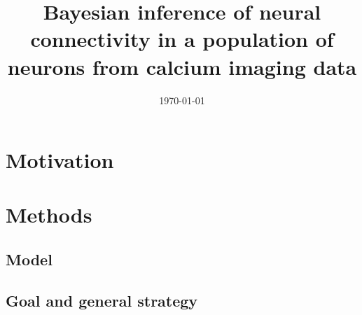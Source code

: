 \documentclass[amsmath, amssymb]{revtex4}
\begin{document}

\date{\today}

\title{Bayesian inference of neural connectivity in a population of neurons from 
calcium imaging data}


\begin{abstract}

\end{abstract}

\maketitle
\tableofcontents

\section{Motivation}
\label{intro}


\section{Methods}
\label{sec:methods}



\subsection{Model} %
\label{sec:methods:markov-setup}


\subsection{Goal and general strategy} %
\label{sec:methods:goal}

\end{document}
